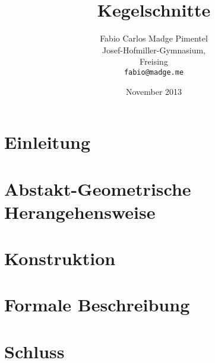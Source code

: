 \documentclass[12pt, a4paper]{report}
\title{Kegelschnitte}
\author{Fabio Carlos Madge Pimentel\\
  Josef-Hofmiller-Gymnasium,\\
  Freising\\
  \texttt{fabio@madge.me}}
\date{November 2013}
\begin{document}


\setcounter{page}{2}
\tableofcontents
\clearpage

\chapter*{Einleitung}


\chapter{Abstakt-Geometrische Herangehensweise}
	

\chapter{Konstruktion}
	

\chapter{Formale Beschreibung}
	

\chapter*{Schluss}





%

\clearpage

\end{document}
